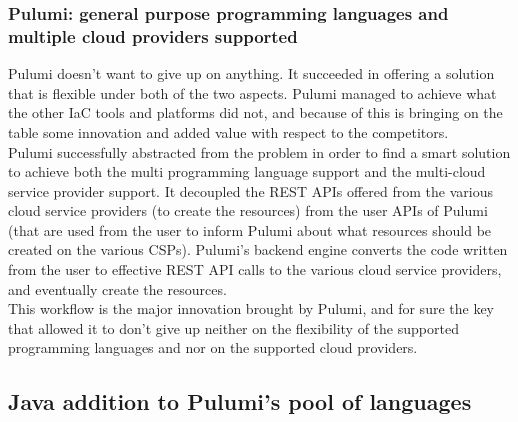 \subsubsection{Pulumi: general purpose programming languages and multiple cloud providers supported}
Pulumi doesn't want to give up on anything.
It succeeded in offering a solution that is flexible under both of the two aspects.
Pulumi managed to achieve what the other IaC tools and platforms did not, and because of this is bringing on the table some innovation and added value with respect to the competitors.\\
Pulumi successfully abstracted from the problem in order to find a smart solution to achieve both the multi programming language support and the multi-cloud service provider support.
It decoupled the REST APIs offered from the various cloud service providers (to create the resources) from the user APIs of Pulumi (that are used from the user to inform Pulumi about what resources should be created on the various CSPs).
Pulumi's backend engine converts the code written from the user to effective REST API calls to the various cloud service providers, and eventually create the resources.\\
This workflow is the major innovation brought by Pulumi, and for sure the key that allowed it to don't give up neither on the flexibility of the supported programming languages and nor on the supported cloud providers.

\subsection{Java addition to Pulumi's pool of languages}

